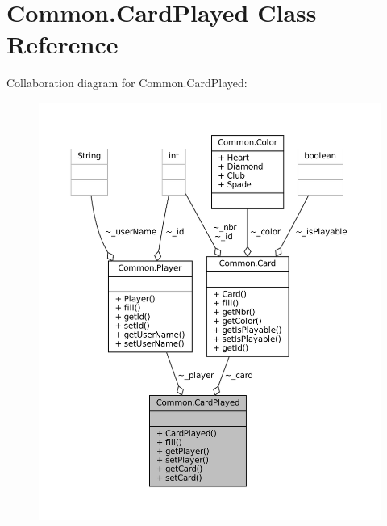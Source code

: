 \hypertarget{classCommon_1_1CardPlayed}{}\section{Common.\+Card\+Played Class Reference}
\label{classCommon_1_1CardPlayed}


Collaboration diagram for Common.\+Card\+Played\+:
\nopagebreak
\begin{figure}[H]
\begin{center}
\leavevmode
\includegraphics[width=350pt]{classCommon_1_1CardPlayed__coll__graph}
\end{center}
\end{figure}
